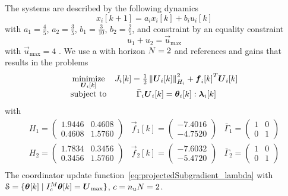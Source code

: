 \documentclass[../main.tex]{subfiles}
\begin{document}
The systems are described by the following \ltidt{} dynamics
\begin{equation}
  \label{eq:example_dynamics}
  x_{i}[k+1]=a_{i}x_{i}[k]+b_{i}u_{i}[k]
\end{equation}
with
$a_1=\frac{4}{5}$, $a_2=\frac{3}{5}$, $b_1=\frac{3}{10}$, $b_2=\frac{2}{5}$,
and
constraint by an equality constraint
\begin{equation}
  \label{eq:example_equality}
  u_{1}+u_{2}=\vec{u}_{\max}
\end{equation}
with
$\vec{u}_{\max}=4$
.
We use a \dmpc{} with horizon ${N=2}$ and references and gains that results in the problems
\begin{equation}
  \begin{matrix}
    \underset{\vec{U}_{i}[k]}{\mathrm{minimize}}&\obji=\frac{1}{2}\norm{\vec{U}_{i}[k]}^{2}_{H_{i}} + {\vec{f}_{i}[k]}^{T}\vec{U}_{i}[k]\\
    \mathrm{subject~ to} & \bar{\Gamma}_{i}\vec{U}_{i}[k] = \thetaik:\lambdaik
  \end{matrix}
  \label{eq:example_local_problem}
\end{equation}
with
\begin{equation}
  \label{eq:1}
  \begin{array}{ccc}
H_1=\left(\begin{array}{cc} 1.9446 & 0.4608\\ 0.4608 & 1.5760 \end{array}\right) & \vec{f}_1[k]=\left(\begin{array}{c} -7.4016\\ -4.7520 \end{array}\right) & \bar{\Gamma}_1=\left(\begin{array}{cc} 1 & 0\\ 0 & 1 \end{array}\right)\\
H_2=\left(\begin{array}{cc} 1.7834 & 0.3456\\ 0.3456 & 1.5760 \end{array}\right) & \vec{f}_2[k]=\left(\begin{array}{c} -7.6032\\ -5.4720 \end{array}\right) & \bar{\Gamma}_2=\left(\begin{array}{cc} 1 & 0\\ 0 & 1 \end{array}\right)\\
  \end{array}
\end{equation}
The coordinator update function~\eqref{eq:projectedSubgradient_lambda} with ${\mathcal{S} = \{\boldsymbol{\theta}[k]\mid I_{c}^{M}\boldsymbol{\theta}[k] = \boldsymbol{U}_{\max}\}}$, $c=n_{u}N=2$.
\end{document}
